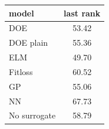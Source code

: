 \begin{tabular}{|lc|}
\hline
model & last rank\\
\hline
DOE & 53.42 \\
DOE plain & 55.36 \\
ELM & 49.70 \\
Fitloss & 60.52 \\
GP & 55.06 \\
NN & 67.73 \\
No surrogate & 58.79 \\
\hline
\end{tabular}

